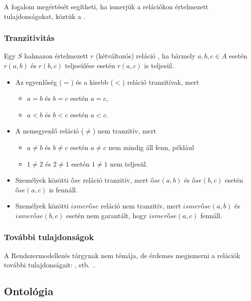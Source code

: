 A  fogalom megértését segítheti, ha ismerjük a relációkon értelmezett tulajdonságokat, köztük a .

\subsubsection{Tranzitivitás}

Egy $S$ halmazon értelmezett $r$ (kétváltozós) reláció , ha bármely $a,b,c \in A$ esetén $r(a, b)$ és $r(b, c)$ teljesülése esetén $r(a, c)$ is teljesül.

\begin{itemize}
	\item Az egyenlőség ($=$) és a kisebb ($<$) reláció tranzitívak, mert
	\begin{itemize}
		\item $a = b$ és $b = c$ esetén $a = c$,
		\item $a < b$ és $b < c$ esetén $a < c$.
	\end{itemize}
	\item A nemegyenlő reláció ($\neq$) nem tranzitív, mert 
	\begin{itemize}
		\item $a \neq b$ és $b \neq c$ esetén $a \neq c$ nem mindig áll fenn, például
		\item $1 \neq 2$ és $2 \neq 1$ esetén $1 \neq 1$ nem teljesül.
	\end{itemize}
	\item Személyek közötti $\mathit{őse}$ reláció tranzitív, mert $\mathit{őse}(a, b)$ és $\mathit{őse}(b, c)$ esetén $\mathit{őse}(a, c)$ is fennáll. 
	\item Személyek közötti $\mathit{ismerőse}$ reláció nem tranzitív, mert $\mathit{ismerőse}(a, b)$ és $\mathit{ismerőse}(b, c)$ esetén nem garantált, hogy $\mathit{ismerőse}(a, c)$ fennáll.
\end{itemize}

\subsubsection{További tulajdonságok}

A Rendszermodellezés tárgynak nem témája, de érdemes megismerni a relációk további tulajdonságait: ,  stb.~\cite{relaciok}. 

\subsection{Ontológia}

